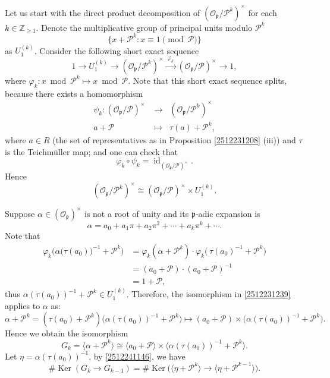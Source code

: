 \documentclass[12pt]{amsart}
\theoremstyle{plain}
\theoremstyle{definition}
\theoremstyle{remark}
\numberwithin{equation}{section}
\DeclareMathOperator{\ke}{Ker}
\newcommand{\Z}{\mathbb Z}
\begin{document}
	Let us start with the direct product decomposition of \((\mathcal{O}_\mathfrak{p} / \mathcal{P}^k)^{\times}\) for each $k\in\Z_{\ge1}$. Denote the multiplicative group of principal units modulo $\mathcal{P}^k$
	\[
	\{ x+\mathcal{P}^k  : x \equiv 1 \!\!\pmod{\mathcal{P}} \}
	\]
	as \(U_1^{(k)}\). Consider the following short exact sequence
	\[
	1 \longrightarrow U_1^{(k)} \longrightarrow (\mathcal{O}_\mathfrak{p} / \mathcal{P}^k)^{\times} \xrightarrow[\quad\;\;]{\varphi_k} (\mathcal{O}_\mathfrak{p} /\mathcal{ P})^{\times} \longrightarrow 1,
	\]
	where \( \varphi_k: x \bmod \mathcal{P}^k \mapsto x \bmod \mathcal{P} \). Note that this short exact sequence splits, because there exists a homomorphism 
	\[
	\begin{split}
		\psi_k: (\mathcal{O}_\mathfrak{p} /\mathcal{ P})^{\times} &\longrightarrow\;\;(\mathcal{O}_\mathfrak{p} / \mathcal{P}^k)^{\times}\\
		a+\mathcal{P}\quad&\longmapsto \;\;\tau(a)+\mathcal{P}^k,
	\end{split}
	\]
	where \( a \in R \) (the set of representatives as in Proposition \ref{2512231208} (iii)) and \(\tau\) is the Teichmüller map; and one can check that
	\[
	\varphi_k \circ \psi_k = \operatorname{id}_{(\mathcal{O}_\mathfrak{p} /\mathcal{ P})^{\times}}.
	\]
	Hence
	\begin{equation}\label{2512231239}
		(\mathcal{O}_\mathfrak{p} / \mathcal{P}^k)^{\times} \cong (\mathcal{O}_\mathfrak{p} /\mathcal{ P})^{\times} \times U_1^{(k)}.
	\end{equation}
	
	Suppose \(\alpha \in (\mathcal{O}_\mathfrak{p})^{\times}\) is not a root of unity and its \(\mathfrak{p}\)-adic expansion is
	\[ \alpha = a_0 + a_1 \pi + a_2 \pi^2 + \cdots + a_k \pi^k + \cdots. \]
	Note that
	\[
	\begin{split}
		\varphi_k \bigl( \alpha \big(\tau(a_0)\big)^{-1} + \mathcal{ P}^k \bigr) 
		&= \varphi_k (\alpha +\mathcal{ P}^k) \cdot \varphi_k \big(\, \tau(a_0)^{-1} + \mathcal{ P}^k\big)\\
		&= (a_0 + \mathcal{ P}) \cdot (a_0 + \mathcal{ P})^{-1} \\
		&= 1 + \mathcal{ P},
	\end{split}
	\]
	thus \( \alpha (\tau(a_0))^{-1} + \mathcal{ P}^k \in U_1^{(k)}\). Therefore, the isomorphism in \eqref{2512231239} applies to \(\alpha\) as:
	\[
	\alpha +\mathcal{ P}^k = (\tau(a_0) +\mathcal{ P}^k) \bigl( \alpha (\tau(a_0))^{-1} +\mathcal{ P}^k \bigr) 
	\longmapsto (a_0 + \mathcal{ P}) \times \big(\alpha (\tau(a_0))^{-1}+ \mathcal{ P}^k\big).
	\]
	Hence we obtain the isomorphism
	\begin{equation}\label{2512241146}
		G_k = \langle \alpha +\mathcal{ P}^k \rangle \cong \langle a_0 + \mathcal{ P} \rangle \times \langle \alpha (\tau(a_0))^{-1} +\mathcal{ P}^k \rangle.
	\end{equation}
	Let $\eta=\alpha (\tau(a_0))^{-1}$, by \eqref{2512241146}, we have
	\begin{equation}\label{2512251206}
		\#\ke(G_k \to G_{k-1})=\#\ke\big(\langle\eta + \mathcal{ P}^k \rangle \to \langle\eta + \mathcal{ P}^{k-1} \rangle\big).
	\end{equation}
	
\end{document}

